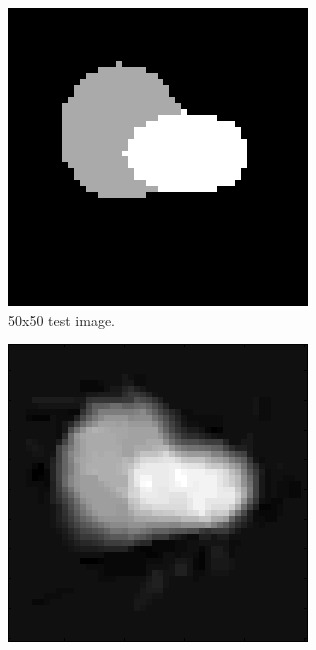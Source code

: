 \documentclass[english]{article}\usepackage[]{graphicx}\usepackage[]{color}
\begin{document}
\begin{figure}[h]
\centering
\begin{subfigure}{.22\textwidth}
  \centering
    \includegraphics[width=1\linewidth]{figures/simulatedresultoriginal}
  \caption{50x50 test image.}
  \vspace{20pt}
  \label{fig:simulresorig}
\end{subfigure}%
\hspace{10pt}
\begin{subfigure}{.22\textwidth}
  \centering
    \includegraphics[width=1\linewidth]{figures/simulatedresultrec}

\end{subfigure}
\end{figure}
\end{document}
